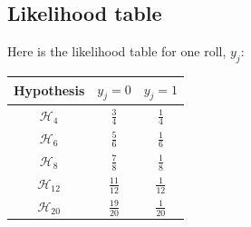 \documentclass[a5paper,11pt]{article}
\begin{document}
\subsection{Likelihood table}
Here is the likelihood table for one roll, $y_j$:

\begin{center}
\begin{tabular}{ | c | c | c | }
    \hline
    Hypothesis          & $y_j = 0$       & $y_j = 1$     \\ \hline
    $\mathcal{H}_{4}$   & $\frac{3}{4}$   & $\frac{1}{4}$ \\ \hline
    $\mathcal{H}_{6}$   & $\frac{5}{6}$   & $\frac{1}{6}$ \\ \hline
    $\mathcal{H}_{8}$   & $\frac{7}{8}$   & $\frac{1}{8}$ \\ \hline
    $\mathcal{H}_{12}$  & $\frac{11}{12}$ & $\frac{1}{12}$ \\ \hline
    $\mathcal{H}_{20}$  & $\frac{19}{20}$   & $\frac{1}{20}$ \\ \hline

  \end{tabular}
\end{center}


\printbibliography{}
\end{document}
